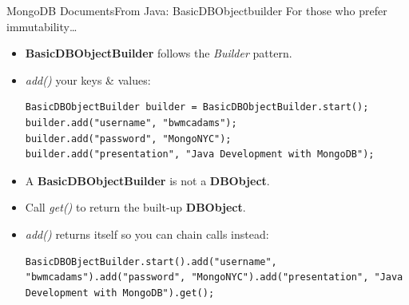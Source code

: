 \documentclass{beamer}
\begin{document}
\begin{frame}[fragile]{MongoDB Documents}{From Java: BasicDBObjectbuilder}
    For those who prefer immutability\dots
    \begin{itemize}
        \item {\bf BasicDBObjectBuilder} follows the {\em Builder} pattern.
        \item<2-> {\em add()} your keys \& values:\\
\begin{lstlisting}
BasicDBObjectBuilder builder = BasicDBObjectBuilder.start();
builder.add("username", "bwmcadams");
builder.add("password", "MongoNYC");
builder.add("presentation", "Java Development with MongoDB");
\end{lstlisting}
        \item<3-> A {\bf BasicDBObjectBuilder} is not a {\bf DBObject}. 
        \item<3-> Call {\em get()} to return the built-up {\bf DBObject}.
        \item<4-> {\em add()} returns itself so you can chain calls instead: 
\begin{lstlisting}
BasicDBOBjectBuilder.start().add("username", "bwmcadams").add("password", "MongoNYC").add("presentation", "Java Development with MongoDB").get();
\end{lstlisting}
    \end{itemize}
\end{frame}
\end{document}
